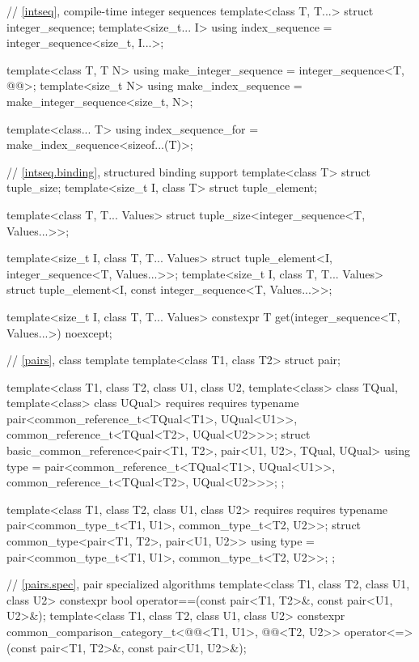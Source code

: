 \begin{codeblock}
{  // \ref{intseq}, compile-time integer sequences%
%
%
  template<class T, T...>
    struct integer_sequence;
  template<size_t... I>
    using index_sequence = integer_sequence<size_t, I...>;

  template<class T, T N>
    using make_integer_sequence = integer_sequence<T, @\seebelow{}@>;
  template<size_t N>
    using make_index_sequence = make_integer_sequence<size_t, N>;

  template<class... T>
    using index_sequence_for = make_index_sequence<sizeof...(T)>;

  // \ref{intseq.binding}, structured binding support
  template<class T> struct tuple_size;
  template<size_t I, class T> struct tuple_element;

  template<class T, T... Values>
    struct tuple_size<integer_sequence<T, Values...>>;

  template<size_t I, class T, T... Values>
    struct tuple_element<I, integer_sequence<T, Values...>>;
  template<size_t I, class T, T... Values>
    struct tuple_element<I, const integer_sequence<T, Values...>>;

  template<size_t I, class T, T... Values>
    constexpr T get(integer_sequence<T, Values...>) noexcept;

  // \ref{pairs}, class template 
  template<class T1, class T2>
    struct pair;

  template<class T1, class T2, class U1, class U2,
           template<class> class TQual, template<class> class UQual>
    requires requires { typename pair<common_reference_t<TQual<T1>, UQual<U1>>,
                                      common_reference_t<TQual<T2>, UQual<U2>>>; }
  struct basic_common_reference<pair<T1, T2>, pair<U1, U2>, TQual, UQual> {
    using type = pair<common_reference_t<TQual<T1>, UQual<U1>>,
                      common_reference_t<TQual<T2>, UQual<U2>>>;
  };

  template<class T1, class T2, class U1, class U2>
    requires requires { typename pair<common_type_t<T1, U1>, common_type_t<T2, U2>>; }
  struct common_type<pair<T1, T2>, pair<U1, U2>> {
    using type = pair<common_type_t<T1, U1>, common_type_t<T2, U2>>;
  };

  // \ref{pairs.spec}, pair specialized algorithms
  template<class T1, class T2, class U1, class U2>
    constexpr bool operator==(const pair<T1, T2>&, const pair<U1, U2>&);
  template<class T1, class T2, class U1, class U2>
    constexpr common_comparison_category_t<@@<T1, U1>,
                                           @@<T2, U2>>
      operator<=>(const pair<T1, T2>&, const pair<U1, U2>&);

}
\end{codeblock}

